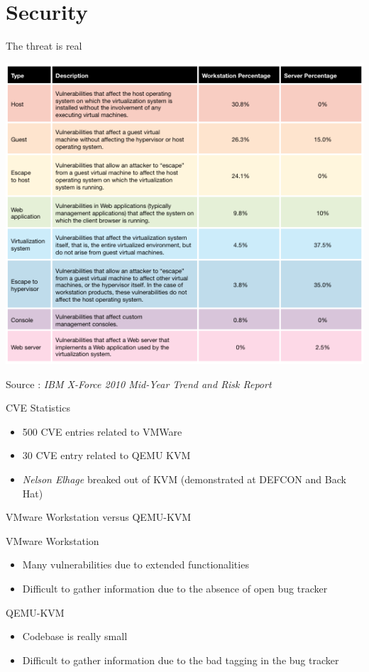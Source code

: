 \documentclass{beamer}
\begin{document}
\section{Security}
\begin{frame}{The threat is real}
	\begin{center}
	\includegraphics[scale=0.3]{table-vuln}
	\end{center}
	Source : \emph{IBM X-Force 2010 Mid-Year Trend and Risk Report}
\end{frame}

\begin{frame}{CVE Statistics}
	\begin{itemize}
	\item 500 CVE entries related to VMWare
	\item 30 CVE entry related to QEMU KVM
	\item \emph{Nelson Elhage} breaked out of KVM (demonstrated at DEFCON and Back Hat)
	\end{itemize}
\end{frame}

\begin{frame}{VMware Workstation versus QEMU-KVM}
	\begin{block}{VMware Workstation}
	\begin{itemize}
	\item Many vulnerabilities due to extended functionalities
	\item Difficult to gather information due to the absence of open bug tracker
	\end{itemize}
	\end{block}
	\begin{block}{QEMU-KVM}
	\begin{itemize}
	\item Codebase is really small
	\item Difficult to gather information due to the bad tagging in the bug tracker
	\end{itemize}
	\end{block}
\end{frame}
\end{document}

